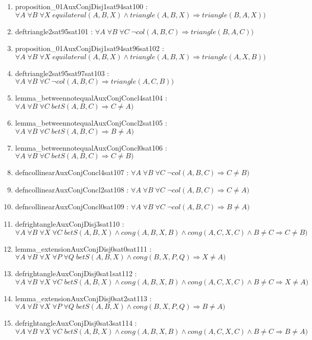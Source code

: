 \documentclass{article}
\begin{document}
\begin{enumerate}
\item proposition\_01AuxConjDisj1sat94sat100 : $\forall A\;\forall B\;\forall X\;equilateral(A, B, X)\wedge triangle(A, B, X) \Rightarrow triangle(B, A, X))$
\item deftriangle2sat95sat101 : $\forall A\;\forall B\;\forall C\;\neg col(A, B, C) \Rightarrow triangle(B, A, C))$
\item proposition\_01AuxConjDisj1sat94sat96sat102 : $\forall A\;\forall B\;\forall X\;equilateral(A, B, X)\wedge triangle(A, B, X) \Rightarrow triangle(A, X, B))$
\item deftriangle2sat95sat97sat103 : $\forall A\;\forall B\;\forall C\;\neg col(A, B, C) \Rightarrow triangle(A, C, B))$
\item lemma\_betweennotequalAuxConjConcl4sat104 : $\forall A\;\forall B\;\forall C\;betS(A, B, C) \Rightarrow C \neq A)$
\item lemma\_betweennotequalAuxConjConcl2sat105 : $\forall A\;\forall B\;\forall C\;betS(A, B, C) \Rightarrow B \neq A)$
\item lemma\_betweennotequalAuxConjConcl0sat106 : $\forall A\;\forall B\;\forall C\;betS(A, B, C) \Rightarrow C \neq B)$
\item defncollinearAuxConjConcl4sat107 : $\forall A\;\forall B\;\forall C\;\neg col(A, B, C) \Rightarrow C \neq B)$
\item defncollinearAuxConjConcl2sat108 : $\forall A\;\forall B\;\forall C\;\neg col(A, B, C) \Rightarrow C \neq A)$
\item defncollinearAuxConjConcl0sat109 : $\forall A\;\forall B\;\forall C\;\neg col(A, B, C) \Rightarrow B \neq A)$
\item defrightangleAuxConjDisj3sat110 : $\forall A\;\forall B\;\forall X\;\forall C\;betS(A, B, X)\wedge cong(A, B, X, B)\wedge cong(A, C, X, C)\wedge B \neq C \Rightarrow C \neq B)$
\item lemma\_extensionAuxConjDisj0sat0sat111 : $\forall A\;\forall B\;\forall X\;\forall P\;\forall Q\;betS(A, B, X)\wedge cong(B, X, P, Q) \Rightarrow X \neq A)$
\item defrightangleAuxConjDisj0sat1sat112 : $\forall A\;\forall B\;\forall X\;\forall C\;betS(A, B, X)\wedge cong(A, B, X, B)\wedge cong(A, C, X, C)\wedge B \neq C \Rightarrow X \neq A)$
\item lemma\_extensionAuxConjDisj0sat2sat113 : $\forall A\;\forall B\;\forall X\;\forall P\;\forall Q\;betS(A, B, X)\wedge cong(B, X, P, Q) \Rightarrow B \neq A)$
\item defrightangleAuxConjDisj0sat3sat114 : $\forall A\;\forall B\;\forall X\;\forall C\;betS(A, B, X)\wedge cong(A, B, X, B)\wedge cong(A, C, X, C)\wedge B \neq C \Rightarrow B \neq A)$

\end{enumerate}
\end{document}
